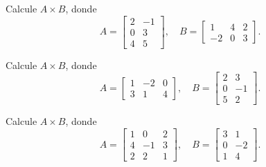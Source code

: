 \begin{ejercicio}
Calcule $A \times B$, donde
\[
A=\begin{bmatrix} 2 & -1 \\ 0 & 3 \\ 4 & 5 \end{bmatrix}, \quad
B=\begin{bmatrix} 1 & 4 & 2 \\ -2 & 0 & 3 \end{bmatrix}.
\]
\end{ejercicio}
\muestraSolucion{
\[
AB=\begin{bmatrix} 4 & 8 & 1 \\ -6 & 0 & 9 \\ -6 & 16 & 23 \end{bmatrix}.
\]
}

\begin{ejercicio}
Calcule $A \times B$, donde
\[
A=\begin{bmatrix} 1 & -2 & 0 \\ 3 & 1 & 4 \end{bmatrix}, \quad
B=\begin{bmatrix} 2 & 3 \\ 0 & -1 \\ 5 & 2 \end{bmatrix}.
\]
\end{ejercicio}
\muestraSolucion{
\[
AB=\begin{bmatrix} 2 & 5 \\ 26 & 16 \end{bmatrix}.
\]
}

\begin{ejercicio}
Calcule $A \times B$, donde
\[
A=\begin{bmatrix} 1 & 0 & 2 \\ 4 & -1 & 3 \\ 2 & 2 & 1 \end{bmatrix}, \quad
B=\begin{bmatrix} 3 & 1 \\ 0 & -2 \\ 1 & 4 \end{bmatrix}.
\]
\end{ejercicio}
\muestraSolucion{
\[
AB=\begin{bmatrix} 5 & 9 \\ 15 & 18 \\ 7 & 2 \end{bmatrix}.
\]
}

